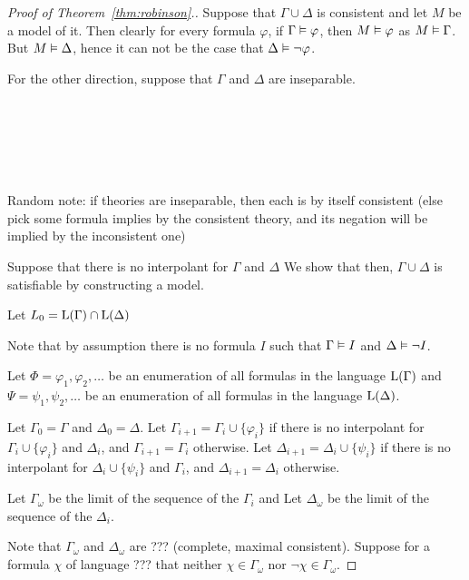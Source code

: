\begin{proof}[Proof of Theorem~\ref{thm:robinson}.]
	Suppose that $\Gamma\cup\Delta$ is consistent and let $M$ be a model of it.
	Then clearly for every formula $\varphi$, if $\Gamma \vDash \varphi$, then $M \vDash \varphi$ as $M \vDash \Gamma$.
	But $M \vDash \Delta$, hence it can not be the case that $\Delta \vDash \lnot \varphi$.

	For the other direction, suppose that $\Gamma$ and $\Delta$ are inseparable.


	~

	~

	~


	Random note: if theories are inseparable, then each is by itself consistent (else pick some formula implies by the consistent theory, and its negation will be implied by the inconsistent one)


	Suppose that there is no interpolant for $\Gamma$ and $\Delta$
	We show that then, $\Gamma\cup\Delta$ is satisfiable by constructing a model.

	Let $L_0 = \operatorname{L}(\Gamma) \cap \operatorname{L}(\Delta)$

	Note that by assumption there is no formula $I$ such that $\Gamma\vDash I$ and $\Delta \vDash \lnot I$.



	Let $\Phi = \varphi_1, \varphi_2, \dots$ be an enumeration of all formulas in the language $\operatorname{L}(\Gamma)$
	and
	$\Psi = \psi_1, \psi_2, \dots$ be an enumeration of all formulas in the language $\operatorname{L}(\Delta)$.

	Let $\Gamma_0 = \Gamma$
	and $\Delta_0 = \Delta$.
	Let $\Gamma_{i+1} = \Gamma_i \cup \{\varphi_i\}$ if there is no interpolant for $\Gamma_i \cup \{\varphi_i\}$ and $\Delta_i$, and $\Gamma_{i+1} = \Gamma_i$ otherwise.
	Let $\Delta_{i+1} = \Delta_i \cup \{\psi_i\}$ if there is no interpolant for $\Delta_i \cup \{\psi_i\}$ and $\Gamma_i$, and $\Delta_{i+1} = \Delta_i$ otherwise.

	Let $\Gamma_\omega$ be the limit of the sequence of the $\Gamma_i$ and
	Let $\Delta_\omega$ be the limit of the sequence of the $\Delta_i$.

	Note that $\Gamma_\omega$ and $\Delta_\omega$ are ??? (complete, maximal consistent).
	Suppose for a formula $\chi$ of language ??? that neither
	$\chi \in \Gamma_\omega$
	nor
	$\lnot\chi \in \Gamma_\omega$.


\end{proof}
